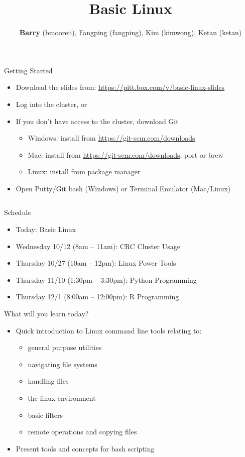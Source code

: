 \documentclass[hyperref={pdfpagelabels=false},12pt]{beamer}
\title[Basic Unix/Linux]{{Basic Linux}}
\author[Basic Unix/Linux]{{\textbf{Barry} (bmooreii), Fangping (fangping), Kim (kimwong), Ketan (ketan)}}
\institute[CRC]{Center for Research Computing}
\date{}
\newcommand{\myvbutton}[2]{\vfill\hyperlink{#1}{\beamerbutton{{#2}}}}
\begin{document}
\begin{frame}[label=started]{Getting Started}
    \begin{itemize}
        \item Download the slides from: \url{https://pitt.box.com/v/basic-linux-slides}
        \item Log into the cluster, or
        \item If you don't have access to the cluster, download Git
        \begin{itemize}
            \item Windows: install from \url{https://git-scm.com/downloads}
            \item Mac: install from \url{https://git-scm.com/downloads}, port or brew
            \item Linux: install from package manager
        \end{itemize}
        \item Open Putty/Git bash (Windows) or Terminal Emulator (Mac/Linux)
    \end{itemize}
\inputminted[bgcolor=lightgray,linenos,fontsize=\scriptsize]{bash}{code/getting-started.txt}
\myvbutton{navigate}{a clickable button}
\end{frame}

\begin{frame}[plain]
\titlepage
\end{frame}

\begin{frame}{Schedule}
\begin{itemize}
    \item Today: Basic Linux
    \item Wednesday 10/12 (8am -- 11am): CRC Cluster Usage
    \item Thursday 10/27 (10am -- 12pm): Linux Power Tools
    \item Thursday 11/10 (1:30pm -- 3:30pm): Python Programming
    \item Thursday 12/1 (8:00am -- 12:00pm): R Programming
\end{itemize}
\end{frame}

\begin{frame}{What will you learn today?}
    \begin{itemize}
        \item Quick introduction to Linux command line tools relating to:
        \begin{itemize}
            \item general purpose utilities
            \item navigating file systems
            \item handling files
            \item the linux environment
            \item basic filters
            \item remote operations and copying files
        \end{itemize}
        \item Present tools and concepts for bash scripting
    \end{itemize}
\end{frame}
\end{document}
